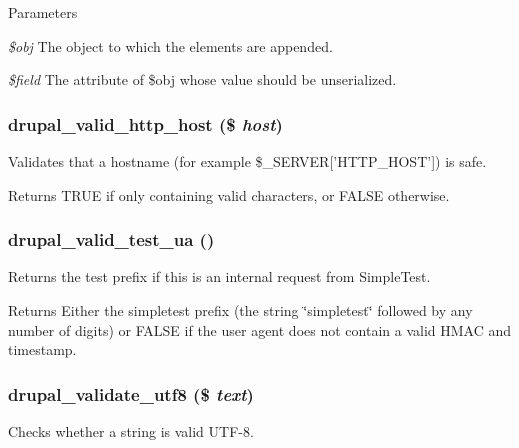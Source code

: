 \begin{DoxyParams}{Parameters}
\item[{\em \$obj}]The object to which the elements are appended. \item[{\em \$field}]The attribute of \$obj whose value should be unserialized. \end{DoxyParams}
\hypertarget{bootstrap_8inc_ae65d9d5f6c34309eb884e51fd39ffb6d}{
\subsubsection[{drupal\_\-valid\_\-http\_\-host}]{\setlength{\rightskip}{0pt plus 5cm}drupal\_\-valid\_\-http\_\-host (\$ {\em host})}}
\label{bootstrap_8inc_ae65d9d5f6c34309eb884e51fd39ffb6d}
Validates that a hostname (for example \$\_\-SERVER\mbox{[}'HTTP\_\-HOST'\mbox{]}) is safe.

\begin{DoxyReturn}{Returns}
TRUE if only containing valid characters, or FALSE otherwise. 
\end{DoxyReturn}
\hypertarget{bootstrap_8inc_abdfb3ad2d4e0a21b9319296b2f4e25e2}{
\subsubsection[{drupal\_\-valid\_\-test\_\-ua}]{\setlength{\rightskip}{0pt plus 5cm}drupal\_\-valid\_\-test\_\-ua ()}}
\label{bootstrap_8inc_abdfb3ad2d4e0a21b9319296b2f4e25e2}
Returns the test prefix if this is an internal request from SimpleTest.

\begin{DoxyReturn}{Returns}
Either the simpletest prefix (the string \char`\"{}simpletest\char`\"{} followed by any number of digits) or FALSE if the user agent does not contain a valid HMAC and timestamp. 
\end{DoxyReturn}
\hypertarget{bootstrap_8inc_abf62947a33393477301b0070b1ff0c7a}{
\subsubsection[{drupal\_\-validate\_\-utf8}]{\setlength{\rightskip}{0pt plus 5cm}drupal\_\-validate\_\-utf8 (\$ {\em text})}}
\label{bootstrap_8inc_abf62947a33393477301b0070b1ff0c7a}
Checks whether a string is valid UTF-\/8.

